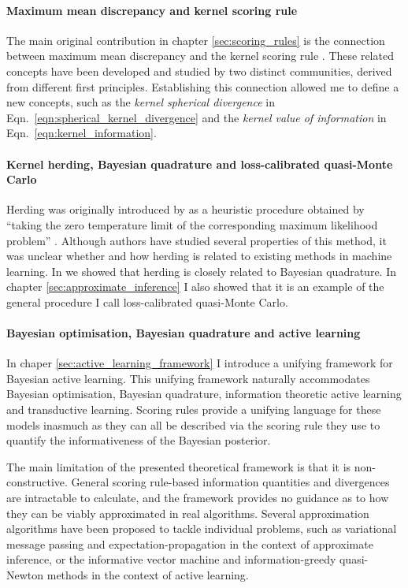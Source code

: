 \paragraph{Maximum mean discrepancy and kernel scoring rule} The main original contribution in chapter \ref{sec:scoring_rules} is the connection between maximum mean discrepancy \citep{Gretton2012} and the kernel scoring rule \citep{Jose2008}. These related concepts have been developed and studied by two distinct communities, derived from different first principles. Establishing this connection allowed me to define a new concepts, such as the \emph{kernel spherical divergence} in Eqn.\ \eqref{eqn:spherical_kernel_divergence} and the \emph{kernel value of information} in Eqn.\ \eqref{eqn:kernel_information}.

\paragraph{Kernel herding, Bayesian quadrature and loss-calibrated quasi-Monte Carlo} Herding was originally introduced by \citet{welling2009herding} as a heuristic procedure obtained by ``taking the zero temperature limit of the corresponding maximum likelihood problem'' \citep[quoted from][]{welling2009herding}. Although authors have studied several properties of this method, it was unclear whether and how herding is related to existing methods in machine learning. In \citep{Huszar2012herding} we showed that herding is closely related to Bayesian quadrature. In chapter \ref{sec:approximate_inference} I also showed that it is an example of the general procedure I call loss-calibrated quasi-Monte Carlo.

\paragraph{Bayesian optimisation, Bayesian quadrature and active learning} In chaper \ref{sec:active_learning_framework} I introduce a unifying framework for Bayesian active learning. This unifying framework naturally accommodates Bayesian optimisation, Bayesian quadrature, information theoretic active learning and transductive learning. Scoring rules provide a unifying language for these models inasmuch as they can all be described via the scoring rule they use to quantify the informativeness of the Bayesian posterior.

\vspace{11pt}

The main limitation of the presented theoretical framework is that it is non-constructive. General scoring rule-based information quantities and divergences are intractable to calculate, and the framework provides no guidance as to how they can be viably approximated in real algorithms. Several approximation algorithms have been proposed to tackle individual problems, such as variational message passing \citep{Winn2006} and expectation-propagation \citep{Minka2001} in the context of approximate inference, or the informative vector machine \citep{Lawrence2004} and information-greedy quasi-Newton methods \citep{Hennig2012newton} in the context of active learning.

